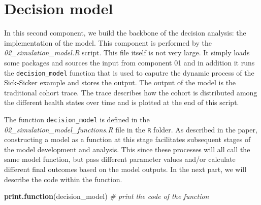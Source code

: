 \documentclass[]{book}
\newenvironment{Shaded}{\begin{snugshade}}{\end{snugshade}}
\newcommand{\CommentTok}[1]{\textcolor[rgb]{0.56,0.35,0.01}{\textit{#1}}}
\newcommand{\KeywordTok}[1]{\textcolor[rgb]{0.13,0.29,0.53}{\textbf{#1}}}
\newcommand{\NormalTok}[1]{#1}
\begin{document}
\hypertarget{simulation}{%
\chapter{Decision model}\label{simulation}}

In this second component, we build the backbone of the decision analysis: the implementation of the model. This component is performed by the \emph{02\_simulation\_model.R} script. This file itself is not very large. It simply loads some packages and sources the input from component 01 and in addition it runs the \texttt{decision\_model} function that is used to caputre the dynamic process of the Sick-Sicker example and stores the output. The output of the model is the traditional cohort trace. The trace describes how the cohort is distributed among the different health states over time and is plotted at the end of this script.

The function \texttt{decision\_model} is defined in the \emph{02\_simulation\_model\_functions.R} file in the \texttt{R} folder. As described in the paper, constructing a model as a function at this stage facilitates subsequent stages of the model development and analysis. This since these processes will all call the same model function, but pass different parameter values and/or calculate different final outcomes based on the model outputs. In the next part, we will describe the code within the function.

\begin{Shaded}
\begin{Highlighting}[]
\KeywordTok{print.function}\NormalTok{(decision_model) }\CommentTok{# print the code of the function}
\end{Highlighting}
\end{Shaded}
\end{document}
